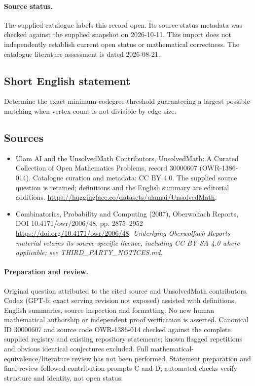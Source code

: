 \documentclass[11pt]{article}
\begin{document}
\paragraph{Source status.}
The supplied catalogue labels this record open. Its source-status metadata was checked against the supplied snapshot on 2026-10-11. This import does not independently establish current open status or mathematical correctness. The catalogue literature assessment is dated 2026-08-21.
\subsection{Short English statement}
Determine the exact minimum-codegree threshold guaranteeing a largest possible matching when vertex count is not divisible by edge size.
\subsection{Sources}
\begin{itemize}
\item[S1] Ulam AI and the UnsolvedMath Contributors, UnsolvedMath: A Curated Collection of Open Mathematics Problems, record 30000607 (OWR-1386-014). Catalogue curation and metadata: CC BY 4.0. The supplied source question is retained; definitions and the English summary are editorial additions.
\url{https://huggingface.co/datasets/ulamai/UnsolvedMath}.
\item[S2] Combinatorics, Probability and Computing (2007), Oberwolfach Reports, DOI 10.4171/owr/2006/48, pp. 2875--2952
\url{https://doi.org/10.4171/owr/2006/48}.
\textit{Underlying Oberwolfach Reports material retains its source-specific licence, including CC BY-SA 4.0 where applicable; see THIRD\_PARTY\_NOTICES.md.}
\end{itemize}
\paragraph{Preparation and review.}
Original question attributed to the cited source and UnsolvedMath contributors. Codex (GPT-6; exact serving revision not exposed) assisted with definitions, English summaries, source inspection and formatting. No new human mathematical authorship or independent proof verification is asserted. Canonical ID 30000607 and source code OWR-1386-014 checked against the complete supplied registry and existing repository statements; known flagged repetitions and obvious identical conjectures excluded. Full mathematical-equivalence/literature review has not been performed. Statement preparation and final review followed contribution prompts C and D; automated checks verify structure and identity, not open status.
\label{end:30000607}
\end{document}
